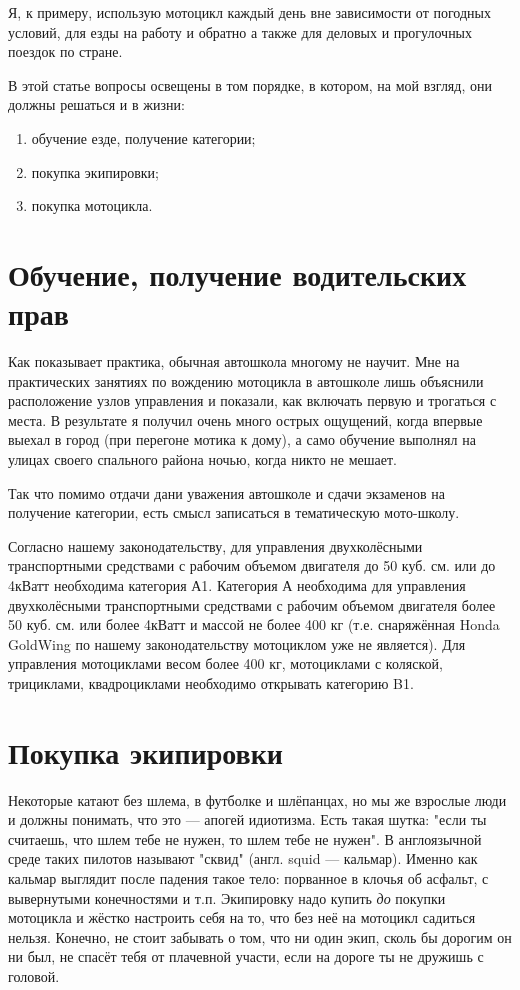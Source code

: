 \documentclass[12pt,a4paper]{article}
\begin{document}
Я, к примеру, использую мотоцикл каждый день вне зависимости от
погодных условий, для езды на работу и обратно а также для деловых и
прогулочных поездок по стране.

В этой статье вопросы освещены в том порядке, в котором, на мой
взгляд, они должны решаться и в жизни:

\begin{enumerate}
\item обучение езде, получение категории;
\item покупка экипировки;
\item покупка мотоцикла.
\end{enumerate}

\section{Обучение, получение водительских прав}

Как показывает практика, обычная автошкола многому не научит.
Мне на практических занятиях по вождению мотоцикла в автошколе лишь
объяснили расположение узлов управления и показали, как включать
первую и трогаться с места. В результате я получил очень много
острых ощущений, когда впервые выехал в город (при перегоне мотика
к дому), а само обучение выполнял на улицах своего спального района
ночью, когда никто не мешает.

Так что помимо отдачи дани уважения автошколе и сдачи экзаменов на
получение категории, есть смысл записаться в тематическую мото-школу.

Согласно нашему законодательству, для управления двухколёсными
транспортными средствами с рабочим объемом двигателя до 50 куб. см.
или до 4кВатт необходима категория А1. Категория А необходима для
управления двухколёсными транспортными средствами с рабочим объемом
двигателя более 50 куб. см. или более 4кВатт и массой не более 400 кг
(т.е. снаряжённая Honda GoldWing по нашему законодательству мотоциклом
уже не является). Для управления мотоциклами весом более 400 кг,
мотоциклами с коляской, трициклами, квадроциклами необходимо открывать
категорию B1.

\section{Покупка экипировки}

Некоторые катают без шлема, в футболке и шлёпанцах, но мы же взрослые
люди и должны понимать, что это --- апогей идиотизма. Есть такая шутка:
"если ты считаешь, что шлем тебе не нужен, то шлем тебе не нужен".
В англоязычной среде таких пилотов называют "сквид" (англ. squid ---
кальмар). Именно как кальмар выглядит после падения такое тело:
порванное в клочья об асфальт, с вывернутыми конечностями и т.п.
Экипировку надо купить \emph{до} покупки мотоцикла и жёстко настроить себя на
то, что без неё на мотоцикл садиться нельзя. Конечно, не стоит забывать
о том, что ни один экип, сколь бы дорогим он ни был, не спасёт тебя от
плачевной участи, если на дороге ты не дружишь с головой.
\end{document}
